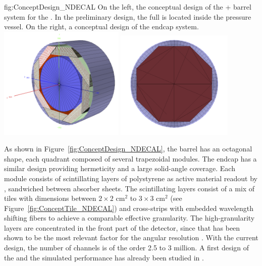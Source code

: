 \begin{dunefigure}{fig:ConceptDesign_NDECAL}
{On the left, the conceptual design of the  +  barrel system for the . In the preliminary design, the full  is located inside the  pressure vessel. On the right, a conceptual design of the  endcap system.}
\includegraphics[width=0.45\textwidth]{graphics/ConceptECALND.png}
\includegraphics[width=0.42\textwidth]{graphics/ECAL_Endcap_System.png}
\end{dunefigure}
As shown in Figure~\ref{fig:ConceptDesign_NDECAL}, the  barrel has an octagonal shape, each quadrant composed of several trapezoidal modules. The  endcap has a similar design providing hermeticity and a large solid-angle coverage. Each module consists of scintillating layers of polystyrene as active material readout by , sandwiched between absorber sheets. The scintillating layers consist of a mix of tiles with dimensions between $2\times2$ cm$^2$ to $3\times3$ cm$^2$ (see Figure~\ref{fig:ConceptTile_NDECAL}) and cross-strips with embedded wavelength shifting fibers to achieve a comparable effective granularity. The high-granularity layers are concentrated in the front part of the detector, since that has been shown to be the most relevant factor for the angular resolution \cite{Emberger:2018pgr}. With the current design, the number of channels is of the order 2.5 to 3 million. A first design of the  and the simulated performance has already been studied in \cite{Emberger:2018pgr}.

